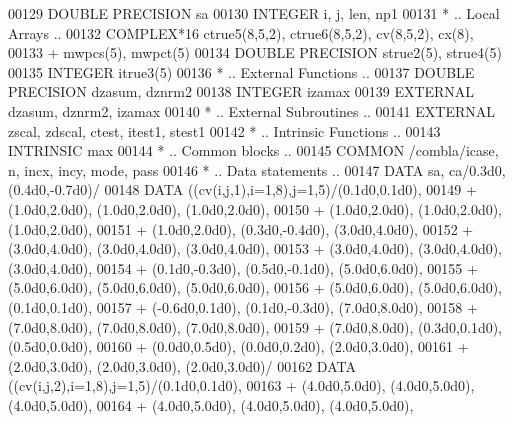 \begin{DoxyCode}
00129       \textcolor{keywordtype}{DOUBLE PRECISION}  sa
00130       \textcolor{keywordtype}{INTEGER}           i, j, len, np1
00131 \textcolor{comment}{*     .. Local Arrays ..}
00132       \textcolor{keywordtype}{COMPLEX*16}        ctrue5(8,5,2), ctrue6(8,5,2), cv(8,5,2), cx(8),
00133      +                  mwpcs(5), mwpct(5)
00134       \textcolor{keywordtype}{DOUBLE PRECISION}  strue2(5), strue4(5)
00135       \textcolor{keywordtype}{INTEGER}           itrue3(5)
00136 \textcolor{comment}{*     .. External Functions ..}
00137       \textcolor{keywordtype}{DOUBLE PRECISION}  dzasum, dznrm2
00138       \textcolor{keywordtype}{INTEGER}           izamax
00139       \textcolor{keywordtype}{EXTERNAL}          dzasum, dznrm2, izamax
00140 \textcolor{comment}{*     .. External Subroutines ..}
00141       \textcolor{keywordtype}{EXTERNAL}          zscal, zdscal, ctest, itest1, stest1
00142 \textcolor{comment}{*     .. Intrinsic Functions ..}
00143       \textcolor{keywordtype}{INTRINSIC}         max
00144 \textcolor{comment}{*     .. Common blocks ..}
00145       \textcolor{keyword}{COMMON}            /combla/icase, n, incx, incy, mode, pass
00146 \textcolor{comment}{*     .. Data statements ..}
00147       \textcolor{keyword}{DATA}              sa, ca/0.3d0, (0.4d0,-0.7d0)/
00148       \textcolor{keyword}{DATA}              ((cv(i,j,1),i=1,8),j=1,5)/(0.1d0,0.1d0),
00149      +                  (1.0d0,2.0d0), (1.0d0,2.0d0), (1.0d0,2.0d0),
00150      +                  (1.0d0,2.0d0), (1.0d0,2.0d0), (1.0d0,2.0d0),
00151      +                  (1.0d0,2.0d0), (0.3d0,-0.4d0), (3.0d0,4.0d0),
00152      +                  (3.0d0,4.0d0), (3.0d0,4.0d0), (3.0d0,4.0d0),
00153      +                  (3.0d0,4.0d0), (3.0d0,4.0d0), (3.0d0,4.0d0),
00154      +                  (0.1d0,-0.3d0), (0.5d0,-0.1d0), (5.0d0,6.0d0),
00155      +                  (5.0d0,6.0d0), (5.0d0,6.0d0), (5.0d0,6.0d0),
00156      +                  (5.0d0,6.0d0), (5.0d0,6.0d0), (0.1d0,0.1d0),
00157      +                  (-0.6d0,0.1d0), (0.1d0,-0.3d0), (7.0d0,8.0d0),
00158      +                  (7.0d0,8.0d0), (7.0d0,8.0d0), (7.0d0,8.0d0),
00159      +                  (7.0d0,8.0d0), (0.3d0,0.1d0), (0.5d0,0.0d0),
00160      +                  (0.0d0,0.5d0), (0.0d0,0.2d0), (2.0d0,3.0d0),
00161      +                  (2.0d0,3.0d0), (2.0d0,3.0d0), (2.0d0,3.0d0)/
00162       \textcolor{keyword}{DATA}              ((cv(i,j,2),i=1,8),j=1,5)/(0.1d0,0.1d0),
00163      +                  (4.0d0,5.0d0), (4.0d0,5.0d0), (4.0d0,5.0d0),
00164      +                  (4.0d0,5.0d0), (4.0d0,5.0d0), (4.0d0,5.0d0),

\end{DoxyCode}

